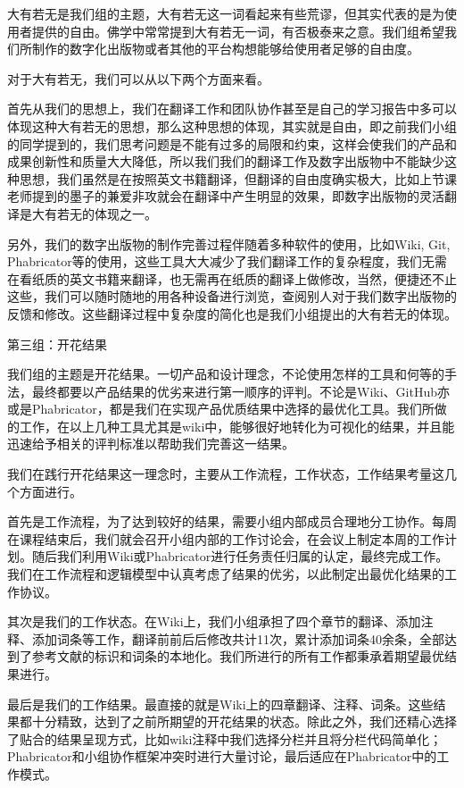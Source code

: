 \documentclass[11pt,fleqn]{book}
\makeatletter
\numberwithin{dummy}{section}
\theoremstyle{ocrenumbox}
\theoremstyle{blacknumex}
\theoremstyle{blacknumbox}
\theoremstyle{ocrenum}
\renewcommand{\section}{\@startsection{section}{1}{\z@}
	{-4ex \@plus -1ex \@minus -.4ex}
	{1ex \@plus.2ex }
	{\normalfont\large\sffamily\bfseries}}
\makeatother
\begin{document}
大有若无是我们组的主题，大有若无这一词看起来有些荒谬，但其实代表的是为使用者提供的自由。佛学中常常提到大有若无一词，有否极泰来之意。我们组希望我们所制作的数字化出版物或者其他的平台构想能够给使用者足够的自由度。

对于大有若无，我们可以从以下两个方面来看。

首先从我们的思想上，我们在翻译工作和团队协作甚至是自己的学习报告中多可以体现这种大有若无的思想，那么这种思想的体现，其实就是自由，即之前我们小组的同学提到的，我们思考问题是不能有过多的局限和约束，这样会使我们的产品和成果创新性和质量大大降低，所以我们我们的翻译工作及数字出版物中不能缺少这种思想，我们虽然是在按照英文书籍翻译，但翻译的自由度确实极大，比如上节课老师提到的墨子的兼爱非攻就会在翻译中产生明显的效果，即数字出版物的灵活翻译是大有若无的体现之一。

另外，我们的数字出版物的制作完善过程伴随着多种软件的使用，比如Wiki, Git, Phabricator等的使用，这些工具大大减少了我们翻译工作的复杂程度，我们无需在看纸质的英文书籍来翻译，也无需再在纸质的翻译上做修改，当然，便捷还不止这些，我们可以随时随地的用各种设备进行浏览，查阅别人对于我们数字出版物的反馈和修改。这些翻译过程中复杂度的简化也是我们小组提出的大有若无的体现。

\section{第三组：开花结果}

我们组的主题是开花结果。一切产品和设计理念，不论使用怎样的工具和何等的手法，最终都要以产品结果的优劣来进行第一顺序的评判。不论是Wiki、GitHub亦或是Phabricator，都是我们在实现产品优质结果中选择的最优化工具。我们所做的工作，在以上几种工具尤其是wiki中，能够很好地转化为可视化的结果，并且能迅速给予相关的评判标准以帮助我们完善这一结果。

我们在践行开花结果这一理念时，主要从工作流程，工作状态，工作结果考量这几个方面进行。

首先是工作流程，为了达到较好的结果，需要小组内部成员合理地分工协作。每周在课程结束后，我们就会召开小组内部的工作讨论会，在会议上制定本周的工作计划。随后我们利用Wiki或Phabricator进行任务责任归属的认定，最终完成工作。我们在工作流程和逻辑模型中认真考虑了结果的优劣，以此制定出最优化结果的工作协议。

其次是我们的工作状态。在Wiki上，我们小组承担了四个章节的翻译、添加注释、添加词条等工作，翻译前前后后修改共计11次，累计添加词条40余条，全部达到了参考文献的标识和词条的本地化。我们所进行的所有工作都秉承着期望最优结果进行。

最后是我们的工作结果。最直接的就是Wiki上的四章翻译、注释、词条。这些结果都十分精致，达到了之前所期望的开花结果的状态。除此之外，我们还精心选择了贴合的结果呈现方式，比如wiki注释中我们选择分栏并且将分栏代码简单化；Phabricator和小组协作框架冲突时进行大量讨论，最后适应在Phabricator中的工作模式。
\end{document}
